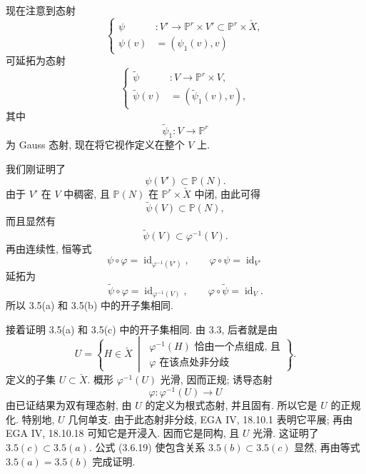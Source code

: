 现在注意到态射
\begin{equation}\tag{3.6.13}
\left\{
\begin{aligned}
\psi &:V'\longrightarrow
  \mathbb P^r\times V'\subset\mathbb P^r\times\check X,\\
\psi(v)&=(\psi_1(v),v)
\end{aligned}
\right.
\end{equation}
可延拓为态射
\begin{equation}\tag{3.6.14}
\left\{
\begin{aligned}
\widetilde\psi &:V\longrightarrow\mathbb P^r\times V,\\
\widetilde\psi(v)&=(\widetilde\psi_1(v),v),
\end{aligned}
\right.
\end{equation}
其中
\begin{equation}\tag{3.6.15}
\widetilde\psi_1:V\longrightarrow\mathbb P^r
\end{equation}
为 Gauss 态射, 现在将它视作定义在整个 $V$ 上.

我们刚证明了
\begin{equation}\tag{3.6.16}
\psi(V')\subset\mathbb P(N).
\end{equation}
由于 $V'$ 在 $V$ 中稠密, 且 $\mathbb P(N)$ 在 $\mathbb P^r\times\check X$ 中闭, 由此可得
\begin{equation}\tag{3.6.17}
\widetilde\psi(V)\subset\mathbb P(N),
\end{equation}
而且显然有
\begin{equation}\tag{3.6.18}
\widetilde\psi(V)\subset\varphi^{-1}(V).
\end{equation}
再由连续性, 恒等式
\[
\psi\circ\varphi=\operatorname{id}_{\varphi^{-1}(V')},
\qquad
\varphi\circ\psi=\operatorname{id}_{V'}
\]
延拓为
\[
\widetilde\psi\circ\varphi=\operatorname{id}_{\varphi^{-1}(V)},
\qquad
\varphi\circ\widetilde\psi=\operatorname{id}_{V}.
\]
所以 3.5(a) 和 3.5(b) 中的开子集相同.

接着证明 3.5(a) 和 3.5(c) 中的开子集相同. 由 3.3, 后者就是由
\begin{equation}\tag{3.6.19}
U=\left\{H\in\check X\ \middle|\
\begin{array}{l}
\varphi^{-1}(H)\text{ 恰由一个点组成, 且}\\
\varphi\text{ 在该点处非分歧}
\end{array}
\right\}.
\end{equation}
定义的子集 $U\subset\check X$. 概形 $\varphi^{-1}(U)$ 光滑, 因而正规; 诱导态射
\[
\varphi:\varphi^{-1}(U)\longrightarrow U
\]
由已证结果为双有理态射, 由 $U$ 的定义为根式态射, 并且固有. 所以它是 $U$ 的正规化. 特别地, $U$ 几何单支. 由于此态射非分歧, EGA IV, 18.10.1 表明它平展; 再由 EGA IV, 18.10.18 可知它是开浸入. 因而它是同构, 且 $U$ 光滑. 这证明了 $3.5(c)\subset 3.5(a)$. 公式 (3.6.19) 使包含关系 $3.5(b)\subset 3.5(c)$ 显然, 再由等式 $3.5(a)=3.5(b)$ 完成证明.